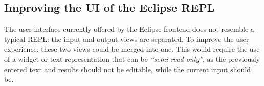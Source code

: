 \subsection{Improving the UI of the Eclipse REPL}

The user interface currently offered by the Eclipse frontend does not resemble a
typical REPL: the input and output views are separated. To improve the user
experience, these two views could be merged into one. This would require the use
of a widget or text representation that can be \textit{``semi-read-only''}, as
the previously entered text and results should not be editable, while the
current input should be.

